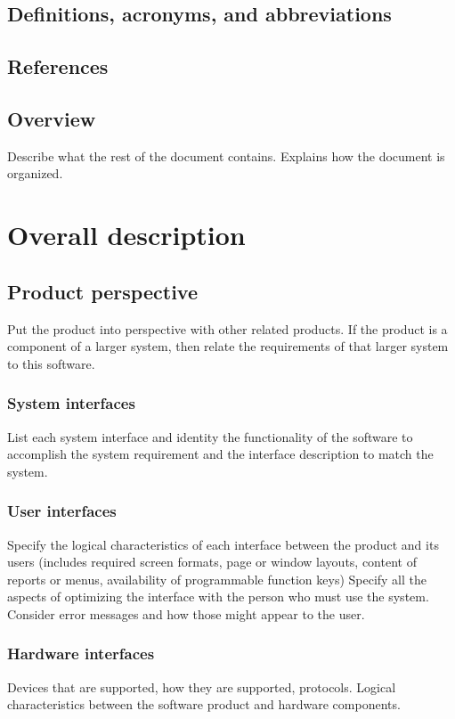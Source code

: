 \documentclass[letterpaper,10pt,draftclsnofoot,onecolumn,titlepage]{IEEEtran}
\begin{document}
	\subsection{Definitions, acronyms, and abbreviations}
	
	\subsection{References}
	
	\subsection{Overview}
	Describe what the rest of the document contains. 
	Explains how the document is organized. 
	
	\section{Overall description}
	\subsection{Product perspective}
	Put the product into perspective with other related products. 
	If the product is a component of a larger system, then relate the requirements of that larger system to this software.
	
	\subsubsection{System interfaces}
	List each system interface and identity the functionality of the software to accomplish the system requirement and the interface description to match the system.
	
	\subsubsection{User interfaces}
	Specify the logical characteristics of each interface between the product and its users (includes required screen formats, page or window layouts, content of reports or menus, availability of programmable function keys)
	Specify all the aspects of optimizing the interface with the person who must use the system. 
	Consider error messages and how those might appear to the user.
	
	\subsubsection{Hardware interfaces}
	Devices that are supported, how they are supported, protocols. 
	Logical characteristics between the software product and hardware components.
	
\end{document}
